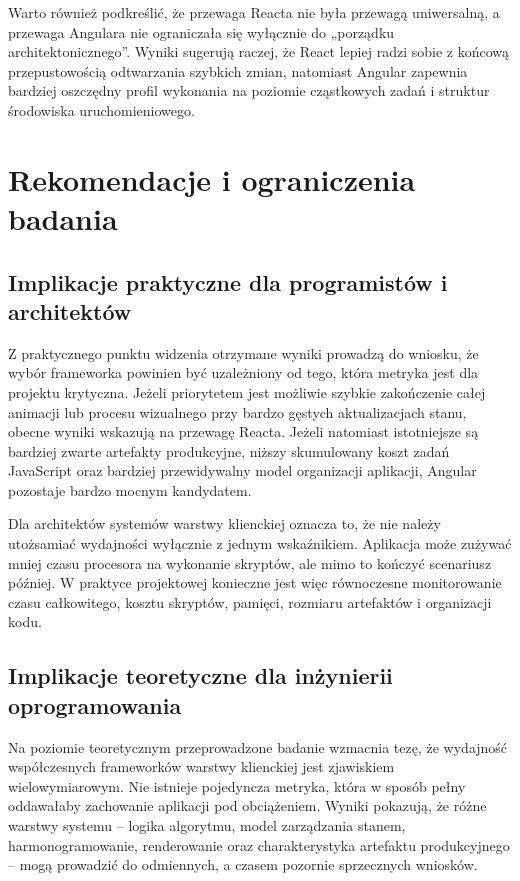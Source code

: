 \documentclass[12pt,openright,twoside]{report}
\begin{document}
Warto również podkreślić, że przewaga Reacta nie była przewagą uniwersalną, a przewaga Angulara nie ograniczała się wyłącznie do „porządku architektonicznego”. Wyniki sugerują raczej, że React lepiej radzi sobie z końcową przepustowością odtwarzania szybkich zmian, natomiast Angular zapewnia bardziej oszczędny profil wykonania na poziomie cząstkowych zadań i struktur środowiska uruchomieniowego.

\section{Rekomendacje i ograniczenia badania}

\subsection{Implikacje praktyczne dla programistów i architektów}
Z praktycznego punktu widzenia otrzymane wyniki prowadzą do wniosku, że wybór frameworka powinien być uzależniony od tego, która metryka jest dla projektu krytyczna. Jeżeli priorytetem jest możliwie szybkie zakończenie całej animacji lub procesu wizualnego przy bardzo gęstych aktualizacjach stanu, obecne wyniki wskazują na przewagę Reacta. Jeżeli natomiast istotniejsze są bardziej zwarte artefakty produkcyjne, niższy skumulowany koszt zadań JavaScript oraz bardziej przewidywalny model organizacji aplikacji, Angular pozostaje bardzo mocnym kandydatem.

Dla architektów systemów warstwy klienckiej oznacza to, że nie należy utożsamiać wydajności wyłącznie z jednym wskaźnikiem. Aplikacja może zużywać mniej czasu procesora na wykonanie skryptów, ale mimo to kończyć scenariusz później. W praktyce projektowej konieczne jest więc równoczesne monitorowanie czasu całkowitego, kosztu skryptów, pamięci, rozmiaru artefaktów i organizacji kodu.

\subsection{Implikacje teoretyczne dla inżynierii oprogramowania}
Na poziomie teoretycznym przeprowadzone badanie wzmacnia tezę, że wydajność współczesnych frameworków warstwy klienckiej jest zjawiskiem wielowymiarowym. Nie istnieje pojedyncza metryka, która w sposób pełny oddawałaby zachowanie aplikacji pod obciążeniem. Wyniki pokazują, że różne warstwy systemu -- logika algorytmu, model zarządzania stanem, harmonogramowanie, renderowanie oraz charakterystyka artefaktu produkcyjnego -- mogą prowadzić do odmiennych, a czasem pozornie sprzecznych wniosków.
\end{document}
